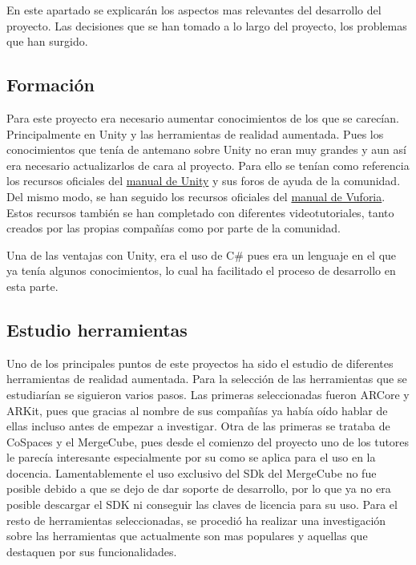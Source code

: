 En este apartado se explicarán los aspectos mas relevantes del desarrollo del proyecto. Las decisiones que se han tomado a lo largo del proyecto, los problemas que han surgido.

\subsection{Formación}
Para este proyecto era necesario aumentar conocimientos de los que se carecían. Principalmente en  Unity y las herramientas de realidad aumentada. Pues los conocimientos que tenía de antemano sobre Unity no eran muy grandes y aun así era necesario actualizarlos de cara al proyecto.
Para ello se tenían como referencia los recursos oficiales del \href{https://docs.unity3d.com/2019.2/Documentation/Manual/UnityManual.html}{manual de Unity} y sus foros de ayuda de la comunidad. Del mismo modo, se han seguido los recursos oficiales del \href{https://library.vuforia.com/getting-started/overview.html}{manual de Vuforia}. Estos recursos también se han completado con diferentes videotutoriales, tanto creados por las propias compañías como por parte de la comunidad.

Una de las ventajas con Unity, era el uso de C\# pues era un lenguaje en el que ya tenía algunos conocimientos, lo cual ha facilitado el proceso de desarrollo en esta parte. 

\subsection{Estudio herramientas}
Uno de los principales puntos de este proyectos ha sido el estudio de diferentes herramientas de realidad aumentada. Para la selección de las herramientas que se estudiarían se siguieron varios pasos. 
Las primeras seleccionadas fueron ARCore y ARKit, pues que gracias al nombre de sus compañías ya había oído hablar de ellas incluso antes de empezar a investigar. Otra de las primeras se trataba de CoSpaces y el MergeCube, pues desde el comienzo del proyecto uno de los tutores le parecía interesante especialmente por su como se aplica para el uso en la docencia. Lamentablemente el uso exclusivo del SDk del MergeCube no fue posible debido a que se dejo de dar soporte de desarrollo, por lo que ya no era posible descargar el SDK ni conseguir las claves de licencia para su uso.
Para el resto de herramientas seleccionadas, se procedió ha realizar una investigación sobre las herramientas que actualmente son mas populares y aquellas que destaquen por sus funcionalidades.

